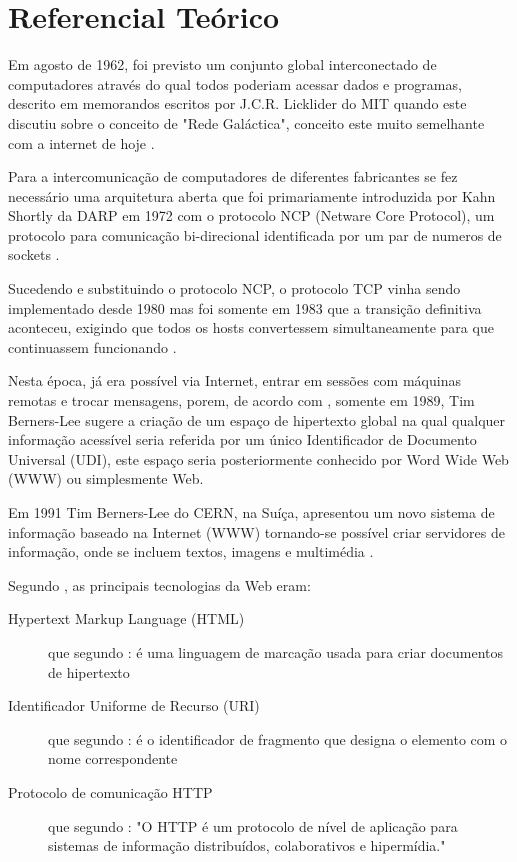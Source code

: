 \section{Referencial Teórico}

Em agosto de 1962, foi previsto um conjunto global interconectado de computadores através do qual todos poderiam acessar dados e programas, descrito em memorandos escritos por J.C.R. Licklider do MIT quando este discutiu sobre o conceito de "Rede Galáctica", conceito este muito semelhante com a internet de hoje \citep[p.~2]{Leiner2009}.

Para a intercomunicação de computadores de diferentes fabricantes se fez necessário uma arquitetura aberta que foi primariamente introduzida por Kahn Shortly da DARP em 1972 com o protocolo NCP (Netware Core Protocol), um protocolo para comunicação bi-direcional identificada por um par de numeros de sockets \citep[p.~4]{Leiner2009}.

Sucedendo e substituindo o protocolo NCP, o protocolo TCP vinha sendo implementado desde 1980 mas foi somente em 1983 que a transição definitiva aconteceu, exigindo que todos os hosts convertessem simultaneamente para que continuassem funcionando \citep[p.~7]{Leiner2009}.

Nesta época, já era possível via Internet, entrar em sessões com máquinas remotas e trocar mensagens, porem, de acordo com \citet{Aghaei2012}, somente em 1989, Tim Berners-Lee sugere a criação de um espaço de hipertexto global na qual qualquer informação acessível seria referida por um único Identificador de Documento Universal (UDI), este espaço seria posteriormente conhecido por Word Wide Web (WWW) ou simplesmente Web.

Em 1991 Tim Berners-Lee do CERN, na Suíça, apresentou um novo sistema de informação baseado na Internet (WWW) tornando-se possível criar servidores de informação, onde se incluem textos, imagens e multimédia \citep{goethals2000historia}.

Segundo \citet{Aghaei2012}, as principais tecnologias da Web eram:
\begin{description}
	\item[Hypertext Markup Language (HTML)] que segundo \citet{Berners-Lee1993}: é uma linguagem de marcação usada para criar documentos de hipertexto

	\item[Identificador Uniforme de Recurso (URI)]  que segundo \citet{Connolly2000}: é o identificador de fragmento que designa o elemento com o nome correspondente

	\item[Protocolo de comunicação HTTP] que segundo \citet[p.~7]{Fielding1999}: "O HTTP é um protocolo de nível de aplicação para sistemas de informação distribuídos, colaborativos e hipermídia."
\end{description}

